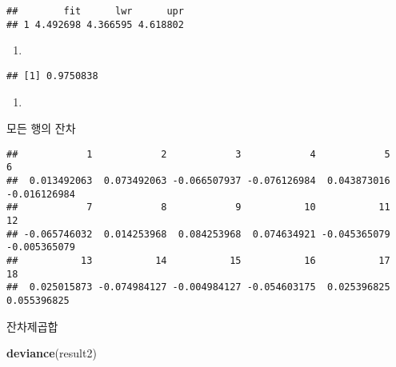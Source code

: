 \documentclass[
]{article}
\newenvironment{Shaded}{\begin{snugshade}}{\end{snugshade}}
\newcommand{\KeywordTok}[1]{\textcolor[rgb]{0.13,0.29,0.53}{\textbf{#1}}}
\newcommand{\NormalTok}[1]{#1}
\newcommand{\OperatorTok}[1]{\textcolor[rgb]{0.81,0.36,0.00}{\textbf{#1}}}
\begin{document}
\begin{verbatim}
##        fit      lwr      upr
## 1 4.492698 4.366595 4.618802
\end{verbatim}

\begin{enumerate}
\def\labelenumi{(\alph{enumi})}
\setcounter{enumi}{6}
\item
\end{enumerate}

\begin{Shaded}
\end{Shaded}

\begin{verbatim}
## [1] 0.9750838
\end{verbatim}

\begin{enumerate}
\def\labelenumi{(\alph{enumi})}
\setcounter{enumi}{7}
\item
\end{enumerate}

모든 행의 잔차

\begin{Shaded}
\end{Shaded}

\begin{verbatim}
##            1            2            3            4            5            6 
##  0.013492063  0.073492063 -0.066507937 -0.076126984  0.043873016 -0.016126984 
##            7            8            9           10           11           12 
## -0.065746032  0.014253968  0.084253968  0.074634921 -0.045365079 -0.005365079 
##           13           14           15           16           17           18 
##  0.025015873 -0.074984127 -0.004984127 -0.054603175  0.025396825  0.055396825
\end{verbatim}

잔차제곱합

\begin{Shaded}
\begin{Highlighting}[]
\KeywordTok{deviance}\NormalTok{(result2)}
\end{Highlighting}
\end{Shaded}
\end{document}

